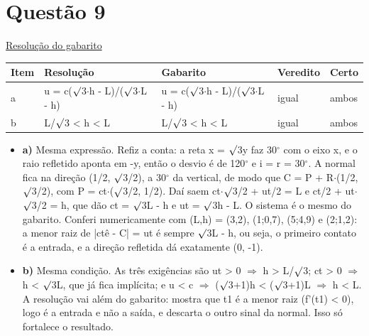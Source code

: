 \documentclass{article}%
\begin{document}
\section*{Questão 9}%
\href{https://poliedroresolve.sistemapoliedro.com.br/vestibulares/ime/2027/ime-2-fase-dia-2-27-10-2026-2-fase-dia-2/dissertativa-9-fisica-2-fase-dia-2-ime-2027}{Resolução do gabarito}\par\smallskip%
\begin{longtable}{@{}p{} p{} p{} p{} p{}@{}}\toprule Item & Resolução & Gabarito & Veredito & Certo \\ \midrule
a & u = c($\surd$3$\cdot$h - L)/($\surd$3$\cdot$L - h) & u = c($\surd$3$\cdot$h - L)/($\surd$3$\cdot$L - h) & igual & ambos \\
b & L/$\surd$3 < h < L & L/$\surd$3 < h < L & igual & ambos \\
\bottomrule\end{longtable}%
\begin{itemize}%
\item%
\textbf{a)} Mesma expressão. Refiz a conta: a reta x = $\surd$3y faz 30$^\circ$ com o eixo x, e o raio refletido aponta em -y, então o desvio é de 120$^\circ$ e i = r = 30$^\circ$. A normal fica na direção (1/2, $\surd$3/2), a 30$^\circ$ da vertical, de modo que C = P + R$\cdot$(1/2, $\surd$3/2), com P = ct$\cdot$($\surd$3/2, 1/2). Daí saem ct$\cdot$$\surd$3/2 + ut/2 = L e ct/2 + ut$\cdot$$\surd$3/2 = h, que dão ct = $\surd$3L - h e ut = $\surd$3h - L. O sistema é o mesmo do gabarito. Conferi numericamente com (L,h) = (3,2), (1;0,7), (5;4,9) e (2;1,2): a menor raiz de |ctê - C| = ut é sempre $\surd$3L - h, ou seja, o primeiro contato é a entrada, e a direção refletida dá exatamente (0, -1).%
\item%
\textbf{b)} Mesma condição. As três exigências são ut > 0 $\Rightarrow$ h > L/$\surd$3; ct > 0 $\Rightarrow$ h < $\surd$3L, que já fica implícita; e u < c $\Rightarrow$ ($\surd$3+1)h < ($\surd$3+1)L $\Rightarrow$ h < L. A resolução vai além do gabarito: mostra que t1 é a menor raiz (f'(t1) < 0), logo é a entrada e não a saída, e descarta o outro sinal da normal. Isso só fortalece o resultado.%
\end{itemize}%
\end{document}
